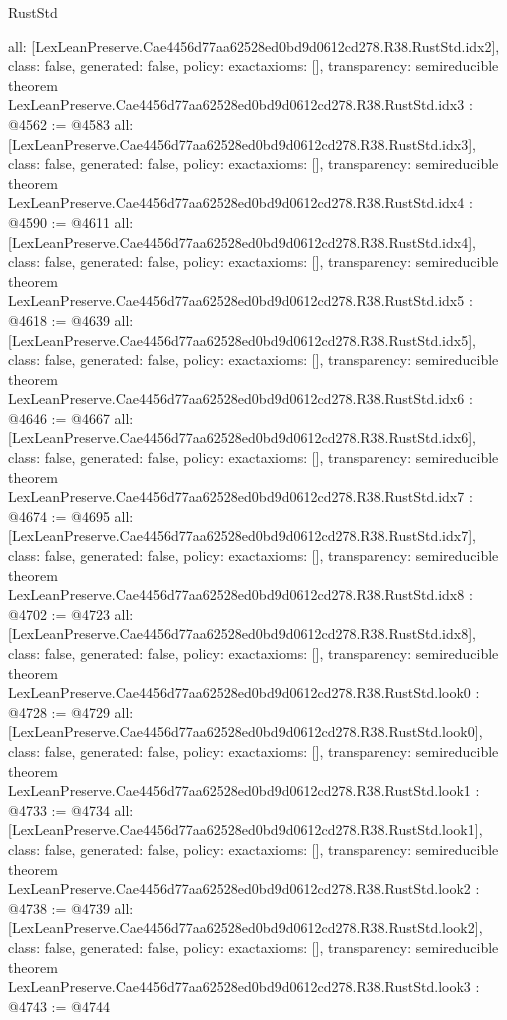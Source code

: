 \begin{lexlean}{RustStd}
\begin{coremodule}
{  all: [LexLeanPreserve.Cae4456d77aa62528ed0bd9d0612cd278.R38.RustStd.idx2],
  class: false,
  generated: false,
  policy: exact{axioms: []},
  transparency: semireducible
}
theorem LexLeanPreserve.Cae4456d77aa62528ed0bd9d0612cd278.R38.RustStd.idx3 : @4562 := @4583 {
  all: [LexLeanPreserve.Cae4456d77aa62528ed0bd9d0612cd278.R38.RustStd.idx3],
  class: false,
  generated: false,
  policy: exact{axioms: []},
  transparency: semireducible
}
theorem LexLeanPreserve.Cae4456d77aa62528ed0bd9d0612cd278.R38.RustStd.idx4 : @4590 := @4611 {
  all: [LexLeanPreserve.Cae4456d77aa62528ed0bd9d0612cd278.R38.RustStd.idx4],
  class: false,
  generated: false,
  policy: exact{axioms: []},
  transparency: semireducible
}
theorem LexLeanPreserve.Cae4456d77aa62528ed0bd9d0612cd278.R38.RustStd.idx5 : @4618 := @4639 {
  all: [LexLeanPreserve.Cae4456d77aa62528ed0bd9d0612cd278.R38.RustStd.idx5],
  class: false,
  generated: false,
  policy: exact{axioms: []},
  transparency: semireducible
}
theorem LexLeanPreserve.Cae4456d77aa62528ed0bd9d0612cd278.R38.RustStd.idx6 : @4646 := @4667 {
  all: [LexLeanPreserve.Cae4456d77aa62528ed0bd9d0612cd278.R38.RustStd.idx6],
  class: false,
  generated: false,
  policy: exact{axioms: []},
  transparency: semireducible
}
theorem LexLeanPreserve.Cae4456d77aa62528ed0bd9d0612cd278.R38.RustStd.idx7 : @4674 := @4695 {
  all: [LexLeanPreserve.Cae4456d77aa62528ed0bd9d0612cd278.R38.RustStd.idx7],
  class: false,
  generated: false,
  policy: exact{axioms: []},
  transparency: semireducible
}
theorem LexLeanPreserve.Cae4456d77aa62528ed0bd9d0612cd278.R38.RustStd.idx8 : @4702 := @4723 {
  all: [LexLeanPreserve.Cae4456d77aa62528ed0bd9d0612cd278.R38.RustStd.idx8],
  class: false,
  generated: false,
  policy: exact{axioms: []},
  transparency: semireducible
}
theorem LexLeanPreserve.Cae4456d77aa62528ed0bd9d0612cd278.R38.RustStd.look0 : @4728 := @4729 {
  all: [LexLeanPreserve.Cae4456d77aa62528ed0bd9d0612cd278.R38.RustStd.look0],
  class: false,
  generated: false,
  policy: exact{axioms: []},
  transparency: semireducible
}
theorem LexLeanPreserve.Cae4456d77aa62528ed0bd9d0612cd278.R38.RustStd.look1 : @4733 := @4734 {
  all: [LexLeanPreserve.Cae4456d77aa62528ed0bd9d0612cd278.R38.RustStd.look1],
  class: false,
  generated: false,
  policy: exact{axioms: []},
  transparency: semireducible
}
theorem LexLeanPreserve.Cae4456d77aa62528ed0bd9d0612cd278.R38.RustStd.look2 : @4738 := @4739 {
  all: [LexLeanPreserve.Cae4456d77aa62528ed0bd9d0612cd278.R38.RustStd.look2],
  class: false,
  generated: false,
  policy: exact{axioms: []},
  transparency: semireducible
}
theorem LexLeanPreserve.Cae4456d77aa62528ed0bd9d0612cd278.R38.RustStd.look3 : @4743 := @4744 {
}
\end{coremodule}
\end{lexlean}
